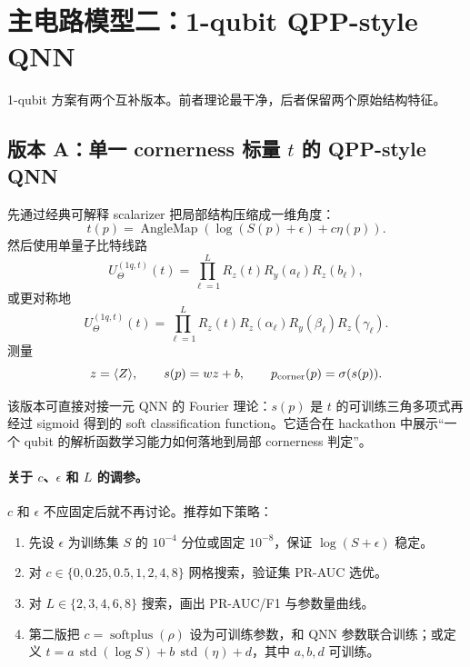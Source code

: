 \documentclass[UTF8,zihao=-4]{ctexart}
\newcommand{\softplus}{\operatorname{softplus}}
\begin{document}
\section{主电路模型二：1-qubit QPP-style QNN}

1-qubit 方案有两个互补版本。前者理论最干净，后者保留两个原始结构特征。

\subsection{版本 A：单一 cornerness 标量 $t$ 的 QPP-style QNN}

先通过经典可解释 scalarizer 把局部结构压缩成一维角度：
\begin{equation}
    t(p)=\operatorname{AngleMap}\left(\log(S(p)+\epsilon)+c\eta(p)\right).
\end{equation}
然后使用单量子比特线路
\begin{equation}
    U^{(1q,t)}_\Theta(t)=\prod_{\ell=1}^{L}
    R_z(t)R_y(a_\ell)R_z(b_\ell),
\end{equation}
或更对称地
\begin{equation}
    U^{(1q,t)}_\Theta(t)=\prod_{\ell=1}^{L}
    R_z(t)R_z(\alpha_\ell)R_y(\beta_\ell)R_z(\gamma_\ell).
\end{equation}
测量
\begin{equation}
    z=\langle Z\rangle,
    \qquad s(p)=wz+b,
    \qquad p_{\rm corner}(p)=\sigma(s(p)).
\end{equation}

该版本可直接对接一元 QNN 的 Fourier 理论：$s(p)$ 是 $t$ 的可训练三角多项式再经过 sigmoid 得到的 soft classification function。它适合在 hackathon 中展示“一个 qubit 的解析函数学习能力如何落地到局部 cornerness 判定”。

\paragraph{关于 $c$、$\epsilon$ 和 $L$ 的调参。}
$c$ 和 $\epsilon$ 不应固定后就不再讨论。推荐如下策略：
\begin{enumerate}[leftmargin=2.0em]
    \item 先设 $\epsilon$ 为训练集 $S$ 的 $10^{-4}$ 分位或固定 $10^{-8}$，保证 $\log(S+\epsilon)$ 稳定。
    \item 对 $c\in\{0,0.25,0.5,1,2,4,8\}$ 网格搜索，验证集 PR-AUC 选优。
    \item 对 $L\in\{2,3,4,6,8\}$ 搜索，画出 PR-AUC/F1 与参数量曲线。
    \item 第二版把 $c=\softplus(\rho)$ 设为可训练参数，和 QNN 参数联合训练；或定义 $t=a\,\operatorname{std}(\log S)+b\,\operatorname{std}(\eta)+d$，其中 $a,b,d$ 可训练。
\end{enumerate}
\end{document}
